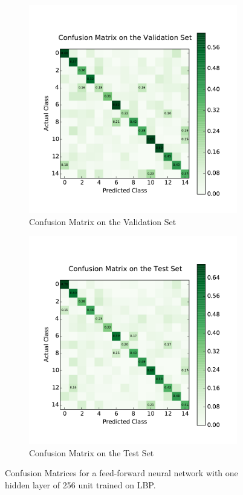 \begin{figure}
	\centering
	\begin{subfigure}[b]{0.45\linewidth}
		\centering
		\includegraphics[width=\linewidth]{images/1/cm_valid.pdf}
		\caption{Confusion Matrix on the Validation Set}
	\end{subfigure}
	\hfill
	\begin{subfigure}[b]{0.45\linewidth}
		\centering
		\includegraphics[width=\linewidth]{images/1/cm_test.pdf}
		\caption{Confusion Matrix on the Test Set}
	\end{subfigure}
	\caption{Confusion Matrices for a feed-forward neural network with one hidden layer of 256 unit trained on LBP.}
	\label{shrine1_mat}
\end{figure}
